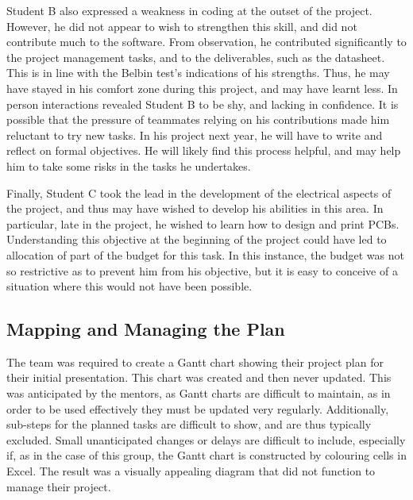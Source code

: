         Student B also expressed a weakness in coding at the outset of the project.
        However, he did not appear to wish to strengthen this skill, and did not contribute much to the software.
        From observation, he contributed significantly to the project management tasks, and to the deliverables, such as the datasheet.
        This is in line with the Belbin test's indications of his strengths.
        Thus, he may have stayed in his comfort zone during this project, and may have learnt less.
        In person interactions revealed Student B to be shy, and lacking in confidence.
        It is possible that the pressure of teammates relying on his contributions made him reluctant to try new tasks.
        In his project next year, he will have to write and reflect on formal objectives.
        He will likely find this process helpful, and may help him to take some risks in the tasks he undertakes.

        Finally, Student C took the lead in the development of the electrical aspects of the project, and thus may have wished to develop his abilities in this area.
        In particular, late in the project, he wished to learn how to design and print PCBs.
        Understanding this objective at the beginning of the project could have led to allocation of part of the budget for this task.
        In this instance, the budget was not so restrictive as to prevent him from his objective, but it is easy to conceive of a situation where this would not have been possible.

    \subsection{Mapping and Managing the Plan}\label{subsec:management-plan}
        The team was required to create a Gantt chart showing their project plan for their initial presentation.
        This chart was created and then never updated.
        This was anticipated by the mentors, as Gantt charts are difficult to maintain, as in order to be used effectively they must be updated very regularly.
        Additionally, sub-steps for the planned tasks are difficult to show, and are thus typically excluded.
        Small unanticipated changes or delays are difficult to include, especially if, as in the case of this group, the Gantt chart is constructed by colouring cells in Excel.
        The result was a visually appealing diagram that did not function to manage their project.

